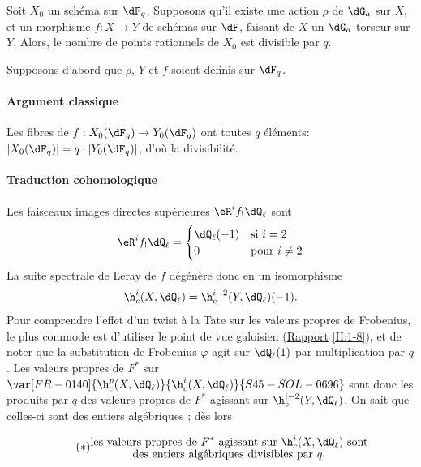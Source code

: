 \begin{theorem_}[Kazhdan]\label{VI:1-13}
Soit $X_0$ un schéma sur $\dF_q$. Supposons qu'il existe une action $\rho$ de 
$\dG_a$ sur $X$, et un morphisme $f:X\to Y$ de schémas sur $\dF$, faisant de 
$X$ un $\dG_a$-torseur sur $Y$. Alors, le nombre de points rationnels de $X_0$ 
est divisible par $q$.
\end{theorem_}

Supposons d'abord que $\rho$, $Y$ et $f$ soient définis sur $\dF_q$. 


\paragraph{Argument classique}
Les fibres de $f:X_0(\dF_q)\to Y_0(\dF_q)$ ont toutes $q$ éléments: 
$|X_0(\dF_q)| = q\cdot |Y_0(\dF_q)|$, d'où la divisibilité. 


\paragraph{Traduction cohomologique}
Les faisceaux images directes supérieures $\eR^i f_!\dQ_\ell$ sont 
\[
  \eR^i f_!\dQ_\ell = \begin{cases}
                       \dQ_\ell(-1) & \text{si $i = 2$} \\
                       0            & \text{pour $i\ne 2$}
                     \end{cases}
\]
La suite spectrale de Leray de $f$ dégénère donc en un isomorphisme 
\[
  \h_c^i(X,\dQ_\ell) = \h_c^{i-2}(Y,\dQ_\ell)(-1) \text{.}
\]
Pour comprendre l'effet d'un twist à la Tate sur les valeurs propres de 
Frobenius, le plus commode est d'utiliser le point de vue galoisien 
(\hyperref[II]{Rapport} \ref{II:1-8}), et de noter que la substitution de 
Frobenius $\varphi$ agit sur $\dQ_\ell(1)$ par multiplication par $q$. Les 
valeurs propres de $F^\ast$ sur $\var[FR-0140]{\h_c^p(X,\dQ_\ell)}{\h_c^i(X,\dQ_\ell)}{S45-SOL-0696}$ sont donc les produits par 
$q$ des valeurs propres de $F^\ast$ agissant sur $\h_c^{i-2}(Y,\dQ_\ell)$. On 
sait que celles-ci sont des entiers algébriques ; dès 
lors 

\begin{equation*}\tag{$*$}\label{VI:eq:*}
  \substack{\displaystyle\text{les valeurs propres de $F^\ast$ agissant sur $\h_c^i(X,\dQ_\ell)$ sont} \\
  \displaystyle\text{des entiers algébriques divisibles par $q$.}}
\end{equation*}


